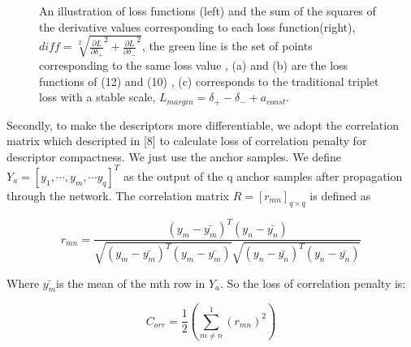 \documentclass[letterpaper, 10 pt, conference]{ieeeconf}  %
\begin{document}
\begin{figure}[htbp]
\centering
{}%
\\
%
\\
%
\centering
\caption{An illustration of loss functions (left)  and the sum of the squares of the derivative values corresponding to each loss function(right), $diff = \sqrt[2]{\frac{\partial L}{\partial \delta _{+}}^{2} + \frac{\partial L}{\partial \delta _{-}}^{2}}$, the green line is the set of points corresponding to the same loss value , (a) and (b) are the loss functions of (12) and (10) , (c) corresponds to the traditional triplet loss with a stable scale, $L_{margin} = \delta _{+} - \delta _{-} + a_{const}.$ } 
\end{figure}
Secondly, to make the descriptors more differentiable, we adopt the correlation matrix which descripted in [8] to calculate loss of correlation penalty for descriptor compactness. We just use the anchor samples. We define $Y_{a} = \left [ y_{1},\cdots, y_{m},\cdots y_{q}\right ]^{T}$ as the output of the q anchor samples after propagation through the network. The correlation matrix  $R = \left [ r_{mn} \right ]_{q\times q}$ is defined as

\begin{small} 
\begin{equation} 
r_{mn} = \frac{(y_{m}-\bar{y_{m}})^{T}(y_{n}-\bar{y_{n}})}{\sqrt{(y_{m}-\bar{y_{m}})^{T}(y_{m}-\bar{y_{m}})}\sqrt{(y_{n}-\bar{y_{n}})^{T}(y_{n}-\bar{y_{n}})}} \tag{12}
\end{equation} 
\end{small}

Where $\bar{y_{m}}$is the mean of the mth row in $Y_{a}$. So the loss of correlation penalty is:

\begin{small} 
\begin{equation} 
C_{orr} = \frac{1}{2}\left ( \sum_{m\neq n}^{1} (r_{mn})^{2} \right ) \tag{13}
\end{equation} 
\end{small}
\end{document}
